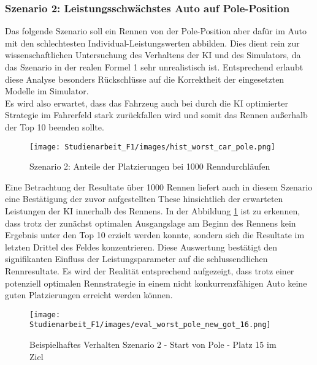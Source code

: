 \subsubsection{Szenario 2: Leistungsschwächstes Auto auf Pole-Position}
Das folgende Szenario soll ein Rennen von der Pole-Position aber dafür im Auto mit den schlechtesten Individual-Leistungswerten abbilden. Dies dient rein zur wissenschaftlichen Untersuchung des Verhaltens der KI und des Simulators, da das Szenario in der realen Formel 1 sehr unrealistisch ist. Entsprechend erlaubt diese Analyse besonders Rückschlüsse auf die Korrektheit der eingesetzten Modelle im Simulator.\\
Es wird also erwartet, dass das Fahrzeug auch bei durch die KI optimierter Strategie im Fahrerfeld stark zurückfallen wird und somit das Rennen außerhalb der Top 10 beenden sollte.\\
\begin{figure}
    \centering
    \texttt{[image: Studienarbeit\_F1/images/hist\_worst\_car\_pole.png]}
    \caption{Szenario 2: Anteile der Platzierungen bei 1000 Renndurchläufen}
    \label{fig:hist_worst_car_pole}
\end{figure}
Eine Betrachtung der Resultate über 1000 Rennen liefert auch in diesem Szenario eine Bestätigung der zuvor aufgestellten These hinsichtlich der erwarteten Leistungen der KI innerhalb des Rennens. In der Abbildung \ref{fig:hist_worst_car_pole} ist zu erkennen, dass trotz der zunächst optimalen Ausgangslage am Beginn des Rennens kein Ergebnis unter den Top 10 erzielt werden konnte, sondern sich die Resultate im letzten Drittel des Feldes konzentrieren. Diese Auswertung bestätigt den signifikanten Einfluss der Leistungsparameter auf die schlussendlichen Rennresultate. Es wird der Realität entsprechend aufgezeigt, dass trotz einer potenziell optimalen Rennstrategie in einem nicht konkurrenzfähigen Auto keine guten Platzierungen erreicht werden können.\\
\begin{figure}
    \texttt{[image: Studienarbeit\_F1/images/eval\_worst\_pole\_new\_got\_16.png]}
    \caption{Beispielhaftes Verhalten Szenario 2 - Start von Pole - Platz 15 im Ziel}
    \label{fig:example_scenario_two}
\end{figure}
